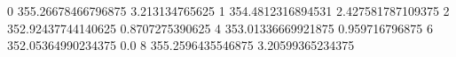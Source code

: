 0 355.26678466796875 3.213134765625
1 354.4812316894531 2.427581787109375
2 352.92437744140625 0.8707275390625
4 353.01336669921875 0.959716796875
6 352.05364990234375 0.0
8 355.2596435546875 3.20599365234375
